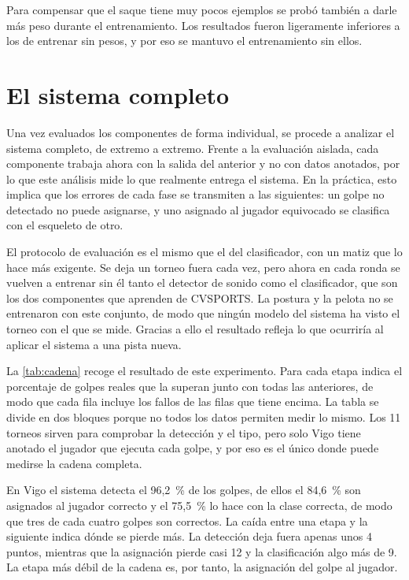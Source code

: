 Para compensar que el saque tiene muy pocos ejemplos se probó también a darle más peso durante el entrenamiento.
Los resultados fueron ligeramente inferiores a los de entrenar sin pesos, y por eso se mantuvo el entrenamiento sin ellos.

\section{El sistema completo}
\label{sec:sistema-completo}

Una vez evaluados los componentes de forma individual, se procede a analizar el sistema completo, de extremo a extremo.
Frente a la evaluación aislada, cada componente trabaja ahora con la salida del anterior y no con datos anotados, por lo que este análisis mide lo que realmente entrega el sistema.
En la práctica, esto implica que los errores de cada fase se transmiten a las siguientes: un golpe no detectado no puede asignarse, y uno asignado al jugador equivocado se clasifica con el esqueleto de otro.

El protocolo de evaluación es el mismo que el del clasificador, con un matiz que lo hace más exigente.
Se deja un torneo fuera cada vez, pero ahora en cada ronda se vuelven a entrenar sin él tanto el detector de sonido como el clasificador, que son los dos componentes que aprenden de CVSPORTS.
La postura y la pelota no se entrenaron con este conjunto, de modo que ningún modelo del sistema ha visto el torneo con el que se mide.
Gracias a ello el resultado refleja lo que ocurriría al aplicar el sistema a una pista nueva.

La \cref{tab:cadena} recoge el resultado de este experimento.
Para cada etapa indica el porcentaje de golpes reales que la superan junto con todas las anteriores, de modo que cada fila incluye los fallos de las filas que tiene encima.
La tabla se divide en dos bloques porque no todos los datos permiten medir lo mismo.
Los 11 torneos sirven para comprobar la detección y el tipo, pero solo Vigo tiene anotado el jugador que ejecuta cada golpe, y por eso es el único donde puede medirse la cadena completa.

\begin{table}[htbp]
  \centering
  \caption{Sistema completo por etapas: porcentaje de golpes reales que superan cada etapa y todas las anteriores.}
  \label{tab:cadena}
  
\end{table}

En Vigo el sistema detecta el 96,2~\% de los golpes, de ellos el 84,6~\% son asignados al jugador correcto y el 75,5~\% lo hace con la clase correcta, de modo que tres de cada cuatro golpes son correctos.
La caída entre una etapa y la siguiente indica dónde se pierde más.
La detección deja fuera apenas unos 4 puntos, mientras que la asignación pierde casi 12 y la clasificación algo más de 9.
La etapa más débil de la cadena es, por tanto, la asignación del golpe al jugador.

